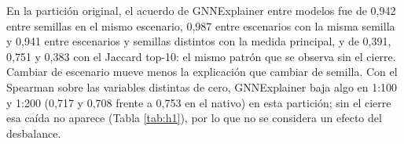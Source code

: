 En la partición original, el acuerdo de GNNExplainer entre modelos fue de 0,942 entre semillas
en el mismo escenario, 0,987 entre escenarios con la misma semilla y 0,941 entre escenarios y
semillas distintos con la medida principal, y de 0,391, 0,751 y 0,383 con el Jaccard top-10: el
mismo patrón que se observa sin el cierre. Cambiar de escenario mueve menos la explicación que
cambiar de semilla. Con el Spearman sobre las variables distintas de cero, GNNExplainer baja
algo en 1:100 y 1:200 (0,717 y 0,708 frente a 0,753 en el nativo) en esta partición; sin el
cierre esa caída no aparece (Tabla \ref{tab:h1}), por lo que no se considera un efecto del
desbalance.
